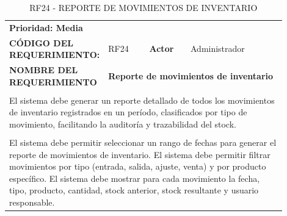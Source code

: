 \begingroup
\renewcommand{\arraystretch}{1.3}
\setlength{\tabcolsep}{6pt}
\centering
\begin{longtable}{|p{0.25\linewidth}|p{0.15\linewidth}|p{0.15\linewidth}|p{0.35\linewidth}|}
\caption{RF24 - REPORTE DE MOVIMIENTOS DE INVENTARIO}\label{tab:rf24}\\
\hline
		\rowcolor{tableheaderblue}
		\multicolumn{4}{|l|}{\textbf{Requerimientos funcionales}}                                                                                                                                               \\ \hline
		\multicolumn{4}{|l|}{\textbf{Prioridad: Media}}                                                                                                                                                         \\ \hline
		\textbf{CÓDIGO DEL REQUERIMIENTO:}                          & RF24                                                               & \cellcolor{tableheaderblue}\textbf{Actor} & Administrador            \\ \hline
		\textbf{NOMBRE DEL REQUERIMIENTO}                           & \multicolumn{3}{l|}{\textbf{Reporte de movimientos de inventario}}                                                                        \\ \hline
		\rowcolor{tableheaderblue}
		\multicolumn{4}{|l|}{\textbf{Descripción}}                                                                                                                                                              \\ \hline
		\multicolumn{4}{|p{0.96\linewidth}|}{%
		El sistema debe generar un reporte detallado de todos los movimientos de inventario registrados en un período, clasificados por tipo de movimiento, facilitando la auditoría y trazabilidad del stock.} \\ \hline
		\rowcolor{tableheaderblue}
		\multicolumn{4}{|l|}{\textbf{Funcionalidad}}                                                                                                                                                            \\ \hline
		\multicolumn{4}{|p{0.96\linewidth}|}{%
		El sistema debe permitir seleccionar un rango de fechas para generar el reporte de movimientos de inventario. \newline
		El sistema debe permitir filtrar movimientos por tipo (entrada, salida, ajuste, venta) y por producto específico. \newline
		El sistema debe mostrar para cada movimiento la fecha, tipo, producto, cantidad, stock anterior, stock resultante y usuario responsable. \newline
}
\end{longtable}
